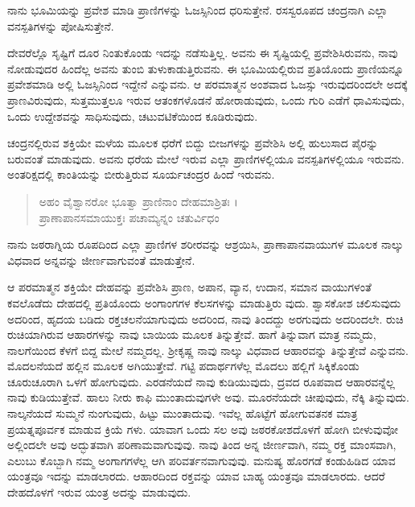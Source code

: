 {\small ನಾನು ಭೂಮಿಯನ್ನು ಪ್ರವೇಶ ಮಾಡಿ ಪ್ರಾಣಿಗಳನ್ನು ಓಜಸ್ಸಿನಿಂದ ಧರಿಸುತ್ತೇನೆ. ರಸಸ್ವರೂಪದ ಚಂದ್ರನಾಗಿ ಎಲ್ಲಾ ವನಸ್ಪತಿಗಳನ್ನು ಪೋಷಿಸುತ್ತೇನೆ.}

ದೇವರೆಲ್ಲೊ ಸೃಷ್ಟಿಗೆ ದೂರ ನಿಂತುಕೊಂಡು ಇದನ್ನು ನಡೆಸುತ್ತಿಲ್ಲ. ಅವನು ಈ ಸೃಷ್ಟಿಯಲ್ಲಿ ಪ್ರವೇಶಿಸಿರುವನು, ನಾವು ನೋಡುವುದರ ಹಿಂದೆಲ್ಲ ಅವನು ತುಂಬಿ ತುಳುಕಾಡುತ್ತಿರುವನು. ಈ ಭೂಮಿಯಲ್ಲಿರುವ ಪ್ರತಿಯೊಂದು ಪ್ರಾಣಿಯನ್ನೂ ಪ್ರವೇಶಮಾಡಿ ಅಲ್ಲಿ ಓಜಸ್ಸಿನಿಂದ ಇದ್ದೇನೆ ಎನ್ನುವನು. ಆ ಪರಮಾತ್ಮನ ಅಂಶವಾದ ಓಜಸ್ಸು ಇರುವುದರಿಂದಲೇ ಅದಕ್ಕೆ ಪ್ರಾಣವಿರುವುದು, ಸುತ್ತಮುತ್ತಲೂ ಇರುವ ಆತಂಕಗಳೊಡನೆ ಹೋರಾಡುವುದು, ಒಂದು ಗುರಿ ಎಡೆಗೆ ಧಾವಿಸುವುದು, ಒಂದು ಉದ್ದೇಶವನ್ನು ಸಾಧಿಸುವುದು, ಚಟುವಟಿಕೆಯಿಂದ ಕೂಡಿರುವುದು.

ಚಂದ್ರನಲ್ಲಿರುವ ಶಕ್ತಿಯೇ ಮಳೆಯ ಮೂಲಕ ಧರೆಗೆ ಬಿದ್ದು ಬೀಜಗಳನ್ನು ಪ್ರವೇಶಿಸಿ ಅಲ್ಲಿ ಹುಲುಸಾದ ಪೈರನ್ನು ಬರುವಂತೆ ಮಾಡುವುದು. ಅವನು ಧರೆಯ ಮೇಲೆ ಇರುವ ಎಲ್ಲಾ ಪ್ರಾಣಿಗಳಲ್ಲಿಯೂ ವನಸ್ಪತಿಗಳಲ್ಲಿಯೂ ಇರುವನು. ಅಂತರಿಕ್ಷದಲ್ಲಿ ಕಾಂತಿಯನ್ನು ಬೀರುತ್ತಿರುವ ಸೂರ್ಯಚಂದ್ರರ ಹಿಂದೆ ಇರುವನು.

\begin{verse}
ಅಹಂ ವೈಶ್ವಾನರೋ ಭೂತ್ವಾ ಪ್ರಾಣಿನಾಂ ದೇಹಮಾಶ್ರಿತಃ ।\\ಪ್ರಾಣಾಪಾನಸಮಾಯುಕ್ತಃ ಪಚಾಮ್ಯನ್ನಂ ಚತುರ್ವಿಧಂ 
\end{verse}

{\small ನಾನು ಜಠರಾಗ್ನಿಯ ರೂಪದಿಂದ ಎಲ್ಲಾ ಪ್ರಾಣಿಗಳ ಶರೀರವನ್ನು ಆಶ್ರಯಿಸಿ, ಪ್ರಾಣಾಪಾನವಾಯುಗಳ ಮೂಲಕ ನಾಲ್ಕು ವಿಧವಾದ ಅನ್ನವನ್ನು ಜೀರ್ಣವಾಗುವಂತೆ ಮಾಡುತ್ತೇನೆ.}

ಆ ಪರಮಾತ್ಮನ ಶಕ್ತಿಯೇ ದೇಹವನ್ನು ಪ್ರವೇಶಿಸಿ ಪ್ರಾಣ, ಅಪಾನ, ವ್ಯಾನ, ಉದಾನ, ಸಮಾನ ವಾಯುಗಳಂತೆ ಕವಲೊಡೆದು ದೇಹದಲ್ಲಿ ಪ್ರತಿಯೊಂದು ಅಂಗಾಂಗಗಳ ಕೆಲಸಗಳನ್ನು ಮಾಡುತ್ತಿರು ವುದು. ಶ್ವಾಸಕೋಶ ಚಲಿಸುವುದು ಅದರಿಂದ, ಹೃದಯ ಬಡಿದು ರಕ್ತಚಲನೆಯಾಗುವುದು ಅದರಿಂದ, ನಾವು ತಿಂದದ್ದು ಅರಗುವುದು ಅದರಿಂದಲೇ. ರುಚಿ ರುಚಿಯಾಗಿರುವ ಆಹಾರಗಳನ್ನು ನಾವು ಬಾಯಿಯ ಮೂಲಕ ತಿನ್ನುತ್ತೇವೆ. ಹಾಗೆ ತಿನ್ನುವಾಗ ಮಾತ್ರ ನಮ್ಮದು, ನಾಲಗೆಯಿಂದ ಕೆಳಗೆ ಬಿದ್ದ ಮೇಲೆ ನಮ್ಮದಲ್ಲ. ಶ್ರೀಕೃಷ್ಣ ನಾವು ನಾಲ್ಕು ವಿಧವಾದ ಆಹಾರವನ್ನು ತಿನ್ನುತ್ತೇವೆ ಎನ್ನುವನು. ಮೊದಲನೆಯದೆ ಹಲ್ಲಿನ ಮೂಲಕ ಅಗಿಯುತ್ತೇವೆ. ಗಟ್ಟಿ ಪದಾರ್ಥಗಳೆಲ್ಲ ಮೊದಲು ಹಲ್ಲಿಗೆ ಸಿಕ್ಕಿಕೊಂಡು ಚೂರುಚೂರಾಗಿ ಒಳಗೆ ಹೋಗುವುದು. ಎರಡನೆಯದೆ ನಾವು ಕುಡಿಯುವುದು, ದ್ರವದ ರೂಪವಾದ ಆಹಾರವನ್ನೆಲ್ಲ ನಾವು ಕುಡಿಯುತ್ತೇವೆ. ಹಾಲು ನೀರು ಕಾಫಿ ಮುಂತಾದುವುಗಳೇ ಅವು. ಮೂರನೆಯದೇ ಚೀಪುವುದು, ನೆಕ್ಕಿ ತಿನ್ನುವುದು. ನಾಲ್ಕನೆಯದೆ ಸುಮ್ಮನೆ ನುಂಗುವುದು, ಹಿಟ್ಟು ಮುಂತಾದುವು. ಇವೆಲ್ಲ ಹೊಟ್ಟೆಗೆ ಹೋಗುವತನಕ ಮಾತ್ರ ಪ್ರಯತ್ನಪೂರ್ವಕ ಮಾಡುವ ಕ್ರಿಯೆ ಗಳು. ಯಾವಾಗ ಒಂದು ಸಲ ಅವು ಜಠರಕೋಶದೊಳಗೆ ಹೋಗಿ ಬೀಳುವುವೋ ಅಲ್ಲಿಂದಲೇ ಅವು ಅದ್ಭುತವಾಗಿ ಪರಿಣಾಮವಾಗುವುವು. ನಾವು ತಿಂದ ಅನ್ನ ಜೀರ್ಣವಾಗಿ, ನಮ್ಮ ರಕ್ತ ಮಾಂಸವಾಗಿ, ಎಲುಬು ಕೊಬ್ಬಾಗಿ ನಮ್ಮ ಅಂಗಾಗಗಳೆಲ್ಲ ಆಗಿ ಪರಿವರ್ತನವಾಗುವುವು. ಮನುಷ್ಯ ಹೊರಗಡೆ ಕಂಡುಹಿಡಿದ ಯಾವ ಯಂತ್ರವೂ ಇದನ್ನು ಮಾಡಲಾರದು. ಆಹಾರದಿಂದ ರಕ್ತವನ್ನು ಯಾವ ಬಾಹ್ಯ ಯಂತ್ರವೂ ಮಾಡಲಾರದು. ಆದರೆ ದೇಹದೊಳಗೆ ಇರುವ ಯಂತ್ರ ಅದನ್ನು ಮಾಡುವುದು.

